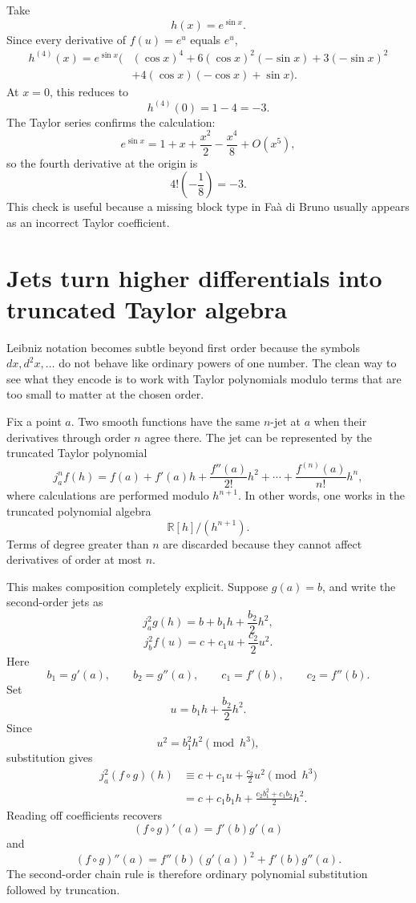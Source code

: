 Take
\[
  h(x)=e^{\sin x}.
\]
Since every derivative of \(f(u)=e^u\) equals \(e^u\),
\[
\begin{aligned}
h^{(4)}(x)=e^{\sin x}\bigl(&
(\cos x)^4
+6(\cos x)^2(-\sin x)
+3(-\sin x)^2\\
&+4(\cos x)(-\cos x)
+\sin x\bigr).
\end{aligned}
\]
At \(x=0\), this reduces to
\[
  h^{(4)}(0)=1-4=-3.
\]
The Taylor series confirms the calculation:
\[
  e^{\sin x}
  =1+x+\frac{x^2}{2}-\frac{x^4}{8}+O(x^5),
\]
so the fourth derivative at the origin is
\[
  4!\left(-\frac18\right)=-3.
\]
This check is useful because a missing block type in Faà di Bruno usually appears as an incorrect Taylor coefficient.

\section{Jets turn higher differentials into truncated Taylor algebra}

Leibniz notation becomes subtle beyond first order because the symbols \(dx,d^2x,\ldots\) do not behave like ordinary powers of one number.  The clean way to see what they encode is to work with Taylor polynomials modulo terms that are too small to matter at the chosen order.

Fix a point \(a\).  Two smooth functions have the same \(n\)-jet at \(a\) when their derivatives through order \(n\) agree there.  The jet can be represented by the truncated Taylor polynomial
\[
  j_a^n f(h)
  =f(a)+f'(a)h+\frac{f''(a)}{2!}h^2+\cdots+
   \frac{f^{(n)}(a)}{n!}h^n,
\]
where calculations are performed modulo \(h^{n+1}\).  In other words, one works in the truncated polynomial algebra
\[
  \mathbb R[h]/(h^{n+1}).
\]
Terms of degree greater than \(n\) are discarded because they cannot affect derivatives of order at most \(n\).

This makes composition completely explicit.  Suppose \(g(a)=b\), and write the second-order jets as
\[
  j_a^2g(h)=b+b_1h+\frac{b_2}{2}h^2,
\]
\[
  j_b^2f(u)=c+c_1u+\frac{c_2}{2}u^2.
\]
Here
\[
  b_1=g'(a),\qquad b_2=g''(a),
  \qquad
  c_1=f'(b),\qquad c_2=f''(b).
\]
Set
\[
  u=b_1h+\frac{b_2}{2}h^2.
\]
Since
\[
  u^2=b_1^2h^2\pmod{h^3},
\]
substitution gives
\[
\begin{aligned}
  j_a^2(f\circ g)(h)
  &\equiv c+c_1u+\frac{c_2}{2}u^2\pmod{h^3}\\
  &=c+c_1b_1h+
  \frac{c_2b_1^2+c_1b_2}{2}h^2.
\end{aligned}
\]
Reading off coefficients recovers
\[
  (f\circ g)'(a)=f'(b)g'(a)
\]
and
\[
  (f\circ g)''(a)
  =f''(b)(g'(a))^2+f'(b)g''(a).
\]
The second-order chain rule is therefore ordinary polynomial substitution followed by truncation.

